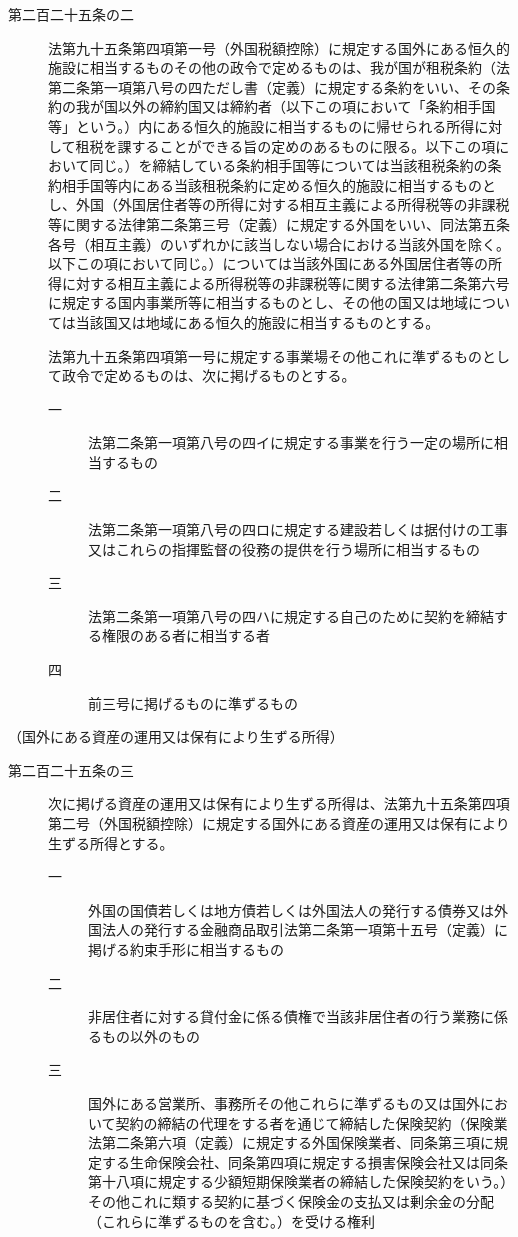 \documentclass[twocolumn,a4j,10pt]{ltjtarticle}
\begin{document}
\begin{description}
\item[第二百二十五条の二]法第九十五条第四項第一号（外国税額控除）に規定する国外にある恒久的施設に相当するものその他の政令で定めるものは、我が国が租税条約（法第二条第一項第八号の四ただし書（定義）に規定する条約をいい、その条約の我が国以外の締約国又は締約者（以下この項において「条約相手国等」という。）内にある恒久的施設に相当するものに帰せられる所得に対して租税を課することができる旨の定めのあるものに限る。以下この項において同じ。）を締結している条約相手国等については当該租税条約の条約相手国等内にある当該租税条約に定める恒久的施設に相当するものとし、外国（外国居住者等の所得に対する相互主義による所得税等の非課税等に関する法律第二条第三号（定義）に規定する外国をいい、同法第五条各号（相互主義）のいずれかに該当しない場合における当該外国を除く。以下この項において同じ。）については当該外国にある外国居住者等の所得に対する相互主義による所得税等の非課税等に関する法律第二条第六号に規定する国内事業所等に相当するものとし、その他の国又は地域については当該国又は地域にある恒久的施設に相当するものとする。
\item[]法第九十五条第四項第一号に規定する事業場その他これに準ずるものとして政令で定めるものは、次に掲げるものとする。
\begin{description}
\item[一]法第二条第一項第八号の四イに規定する事業を行う一定の場所に相当するもの
\item[二]法第二条第一項第八号の四ロに規定する建設若しくは据付けの工事又はこれらの指揮監督の役務の提供を行う場所に相当するもの
\item[三]法第二条第一項第八号の四ハに規定する自己のために契約を締結する権限のある者に相当する者
\item[四]前三号に掲げるものに準ずるもの
\end{description}
\end{description}
\noindent\hspace{10pt}（国外にある資産の運用又は保有により生ずる所得）
\begin{description}
\item[第二百二十五条の三]次に掲げる資産の運用又は保有により生ずる所得は、法第九十五条第四項第二号（外国税額控除）に規定する国外にある資産の運用又は保有により生ずる所得とする。
\begin{description}
\item[一]外国の国債若しくは地方債若しくは外国法人の発行する債券又は外国法人の発行する金融商品取引法第二条第一項第十五号（定義）に掲げる約束手形に相当するもの
\item[二]非居住者に対する貸付金に係る債権で当該非居住者の行う業務に係るもの以外のもの
\item[三]国外にある営業所、事務所その他これらに準ずるもの又は国外において契約の締結の代理をする者を通じて締結した保険契約（保険業法第二条第六項（定義）に規定する外国保険業者、同条第三項に規定する生命保険会社、同条第四項に規定する損害保険会社又は同条第十八項に規定する少額短期保険業者の締結した保険契約をいう。）その他これに類する契約に基づく保険金の支払又は剰余金の分配（これらに準ずるものを含む。）を受ける権利
\end{description}
\end{description}
\end{document}
